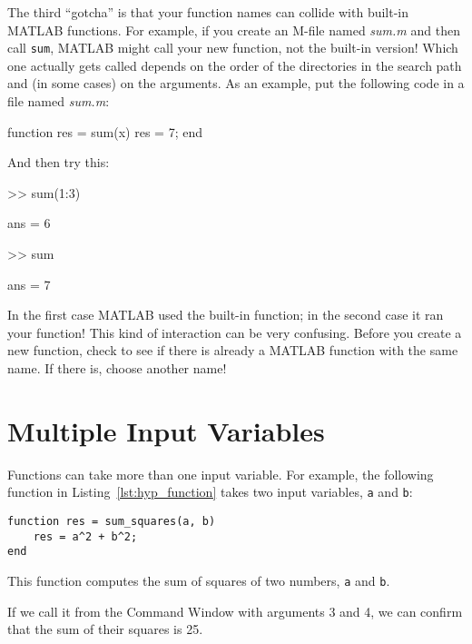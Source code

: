 The third ``gotcha'' is that your function names can collide with built-in
MATLAB functions.  For example, if you create an M-file named \emph{sum.m} and then call \lstinline{sum}, MATLAB might call your new
function, not the built-in version!  Which one actually gets called
depends on the order of the directories in the search path and
(in some cases) on the arguments.  As an example, put the following
code in a file named \emph{sum.m}:


\begin{code}
function res = sum(x)
   res = 7;
end
\end{code}

And then try this:

\begin{code}
>> sum(1:3)

ans = 6

>> sum

ans = 7
\end{code}

In the first case MATLAB used the built-in function; in the second
case it ran your function!  This kind of interaction can be very
confusing.  Before you create a new function, check to see if there is
already a MATLAB function with the same name.  If there is, choose
another name!

\section{Multiple Input Variables}
\label{hypotenuse}


Functions can take more than one input variable.
For example, the following function in Listing~\ref{lst:hyp_function} takes two input variables,
\lstinline{a} and \lstinline{b}:

\begin{lstlisting}[caption={A function that computes the sum of squares of two numbers}, label={lst:hyp_function}]
function res = sum_squares(a, b)
    res = a^2 + b^2;
end
\end{lstlisting}
  
This function computes the sum of squares of two numbers, \lstinline{a}
and \lstinline{b}.

If we call it from the Command Window with arguments 3 and 4, we can
confirm that the sum of their squares is 25.

